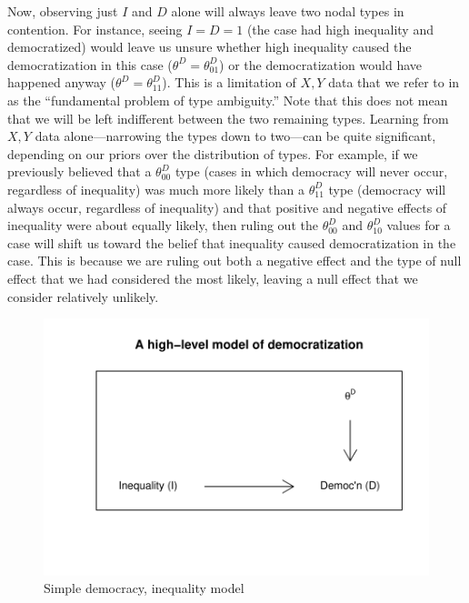 \documentclass[
  12pt,
]{book}
\begin{document}
Now, observing just \(I\) and \(D\) alone will always leave two nodal types in contention. For instance, seeing \(I=D=1\) (the case had high inequality and democratized) would leave us unsure whether high inequality caused the democratization in this case (\(\theta^D=\theta_{01}^D\)) or the democratization would have happened anyway (\(\theta^D=\theta_{11}^D\)). This is a limitation of \(X, Y\) data that we refer to in \citet{humphreys2015mixing} as the ``fundamental problem of type ambiguity.'' Note that this does not mean that we will be left indifferent between the two remaining types. Learning from \(X, Y\) data alone---narrowing the types down to two---can be quite significant, depending on our priors over the distribution of types. For example, if we previously believed that a \(\theta_{00}^D\) type (cases in which democracy will never occur, regardless of inequality) was much more likely than a \(\theta_{11}^D\) type (democracy will always occur, regardless of inequality) and that positive and negative effects of inequality were about equally likely, then ruling out the \(\theta_{00}^D\) and \(\theta_{10}^D\) values for a case will shift us toward the belief that inequality caused democratization in the case. This is because we are ruling out both a negative effect and the type of null effect that we had considered the most likely, leaving a null effect that we consider relatively unlikely.

\begin{figure}

{\centering \includegraphics{ii_files/figure-latex/dagdemochigh-1} 

}

\caption{Simple democracy, inequality model}\label{fig:dagdemochigh}
\end{figure}
\end{document}

